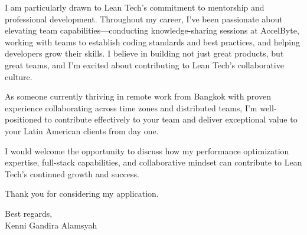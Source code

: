 \documentclass[11pt,a4paper]{article}
\begin{document}
\vspace{1em}

I am particularly drawn to Lean Tech's commitment to mentorship and professional development. Throughout my career, I've been passionate about elevating team capabilities---conducting knowledge-sharing sessions at AccelByte, working with teams to establish coding standards and best practices, and helping developers grow their skills. I believe in building not just great products, but great teams, and I'm excited about contributing to Lean Tech's collaborative culture.

\vspace{1em}

As someone currently thriving in remote work from Bangkok with proven experience collaborating across time zones and distributed teams, I'm well-positioned to contribute effectively to your team and deliver exceptional value to your Latin American clients from day one.

\vspace{1em}

I would welcome the opportunity to discuss how my performance optimization expertise, full-stack capabilities, and collaborative mindset can contribute to Lean Tech's continued growth and success.

\vspace{1em}

Thank you for considering my application.

\vspace{1em}

Best regards,\\
Kenni Gandira Alamsyah
\end{document}
